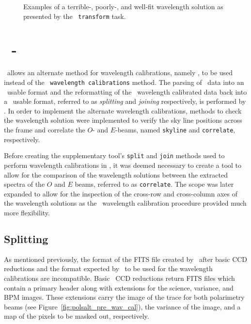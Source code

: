 \begin{figure}[t]
    \centering
    \caption{Examples of a terrible-, poorly-, and well-fit wavelength solution as presented by the \iraf\ \texttt{transform} task.}
    \label{fig:iraf_tran_eg}
\end{figure}

\section[\stops]{\stops\ - } \label{sec:stops}

\stops\ allows an alternate method for wavelength calibrations, namely \iraf, to be used instead of the \polsalt\ \texttt{wavelength calibrations} method. The parsing of \polsalt\ data into an \iraf\ usable format and the reformatting of the \iraf\ wavelength calibrated data back into a \polsalt\ usable format, referred to as \textit{splitting} and \textit{joining} respectively, is performed by \stops. In order to implement the alternate wavelength calibrations, methods to check the wavelength solution were implemented to verify the sky line positions across the frame and correlate the $O$- and $E$-beams, named \texttt{skyline} and \texttt{correlate}, respectively.

Before creating the supplementary tool's \texttt{split} and \texttt{join} methods used to perform wavelength calibrations in \iraf, it was deemed necessary to create a tool to allow for the comparison of the wavelength solutions between the extracted spectra of the $O$ and $E$ beams, referred to as \texttt{correlate}. The scope was later expanded to allow for the inspection of the cross-row and cross-column axes of the wavelength solutions as the \iraf\ wavelength calibration procedure provided much more flexibility.

\subsection{Splitting}

As mentioned previously, the format of the \gls{FITS} file created by \polsalt\ after basic \gls{CCD} reductions and the format expected by \iraf\ to be used for the wavelength calibrations are incompatible. Basic \polsalt\ \gls{CCD} reductions return \gls{FITS} files which contain a primary header along with extensions for the science, variance, and \gls{BPM} images. These extensions carry the image of the trace for both polarimetry beams (see Figure~\ref{fig:polsalt_pre_wav_cal}), the variance of the image, and a map of the pixels to be masked out, respectively.

